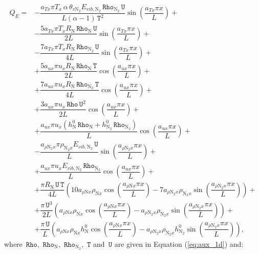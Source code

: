 \documentclass[10pt]{article}
\newcommand{\Rho}{\,\mathtt{Rho}}
\newcommand{\T}{\,\mathtt{T}}
\newcommand{\U}{\,\mathtt{U}}
\begin{document}
\begin{equation}
\begin{split}
 Q_E = &-\dfrac{a_{Tx} \pi T_x \,\alpha\, \theta_{v \text{N}_2} E_{vib, \text{N}_2} \Rho_{\text{N}_2} \U }{L (\alpha-1) \T^2}\sin\left(\dfrac{a_{Tx} \pi x}{L}\right)+\\
&- \dfrac{5a_{Tx} \pi T_x R_\text{N} \Rho_\text{N} \U }{2L}\sin\left(\dfrac{a_{Tx} \pi x}{L}\right)+\\
&- \dfrac{7a_{Tx} \pi T_x R_\text{N} \Rho_{\text{N}_2} \U }{4L}\sin\left(\dfrac{a_{Tx} \pi x}{L}\right)+\\
&+ \dfrac{5a_{ux} \pi u_x R_\text{N} \Rho_\text{N} \T }{2L}\cos\left(\dfrac{a_{ux} \pi x}{L}\right)+\\
&+ \dfrac{7a_{ux} \pi u_x R_\text{N} \Rho_{\text{N}_2} \T }{4L}\cos\left(\dfrac{a_{ux} \pi x}{L}\right)+\\
&+ \dfrac{3a_{ux} \pi u_x \Rho \U^2 }{2L}\cos\left(\dfrac{a_{ux} \pi x}{L}\right)+\\
&+\dfrac{a_{ux} \pi u_x (h^0_{\text{N}} \Rho_\text{N} +h^0_{\text{N}_2} \Rho_{\text{N}_2})}{L}\cos\left(\dfrac{a_{ux} \pi x}{L}\right)+\\
&-\dfrac{a_{ \rho \text{N}_2 x} \pi \rho_{\text{N}_2 x} E_{vib, \text{N}_2} \U }{L}\sin\left(\dfrac{a_{ \rho \text{N}_2 x} \pi x}{L}\right)+\\
&+\dfrac{a_{ux} \pi u_x E_{vib, \text{N}_2} \Rho_{\text{N}_2} }{L}\cos\left(\dfrac{a_{ux} \pi x}{L}\right)+\\
&+\dfrac{\pi R_\text{N} \U \T}{4L}\left(10 a_{ \rho \text{N} x} \rho_{\text{N}x} \cos\left(\dfrac{a_{ \rho \text{N} x} \pi x}{L}\right)-7 a_{ \rho \text{N}_2 x} \rho_{\text{N}_2 x} \sin\left(\dfrac{a_{ \rho \text{N}_2 x} \pi x}{L}\right)\right) +\\
&+\dfrac{\pi \U^3}{2L}\left(a_{ \rho \text{N} x} \rho_{\text{N}x} \cos\left(\dfrac{a_{ \rho \text{N} x} \pi x}{L}\right)-a_{ \rho \text{N}_2 x} \rho_{\text{N}_2 x} \sin\left(\dfrac{a_{ \rho \text{N}_2 x} \pi x}{L}\right)\right) +\\
&+\dfrac{\pi \U}{L}\left(a_{ \rho \text{N} x} \rho_{\text{N}x} h^0_{\text{N}} \cos\left(\dfrac{a_{ \rho \text{N} x} \pi x}{L}\right)-a_{ \rho \text{N}_2 x} \rho_{\text{N}_2 x} h^0_{\text{N}_2} \sin\left(\dfrac{a_{ \rho \text{N}_2 x} \pi x}{L}\right)\right),
\end{split}
\end{equation}
where $\Rho,\,\Rho_{\text{N}},\,\Rho_{\text{N}_2},\, \T$ and $\U$ are given  in Equation (\ref{eq:aux_1d}) and:
\end{document}
